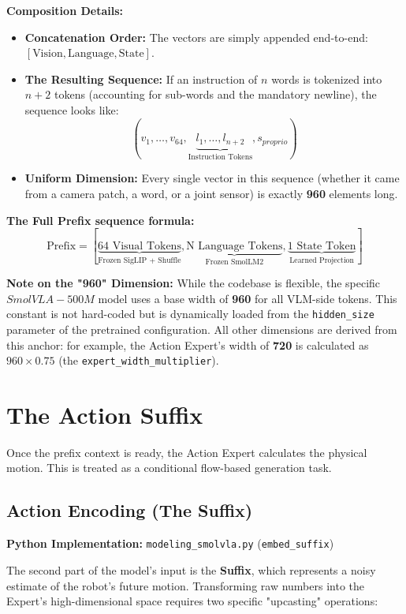 \documentclass[11pt,a4paper]{article}
\begin{document}
\textbf{Composition Details:}
\begin{itemize}
    \item \textbf{Concatenation Order:} The vectors are simply appended end-to-end: $[ \text{Vision} , \text{Language} , \text{State} ]$.
    \item \textbf{The Resulting Sequence:} If an instruction of $n$ words is tokenized into $n+2$ tokens (accounting for sub-words and the mandatory newline), the sequence looks like:
    \[ (v_1, \dots, v_{64}, \underbrace{l_1, \dots, l_{n+2}}_{\text{Instruction Tokens}}, s_{proprio}) \]
    \item \textbf{Uniform Dimension:} Every single vector in this sequence (whether it came from a camera patch, a word, or a joint sensor) is exactly \textbf{960} elements long.
\end{itemize}

\textbf{The Full Prefix sequence formula:}
\[ \text{Prefix} = [ \underbrace{\text{64 Visual Tokens}}_{\text{Frozen SigLIP + Shuffle}} , \underbrace{\text{N Language Tokens}}_{\text{Frozen SmolLM2}} , \underbrace{\text{1 State Token}}_{\text{Learned Projection}} ] \]

\textbf{Note on the "960" Dimension:}
While the codebase is flexible, the specific $SmolVLA-500M$ model uses a base width of \textbf{960} for all VLM-side tokens. This constant is not hard-coded but is dynamically loaded from the \texttt{hidden\_size} parameter of the pretrained configuration. All other dimensions are derived from this anchor: for example, the Action Expert's width of \textbf{720} is calculated as $960 \times 0.75$ (the \texttt{expert\_width\_multiplier}).

\section{The Action Suffix}
Once the prefix context is ready, the Action Expert calculates the physical motion. This is treated as a conditional flow-based generation task.

\subsection{Action Encoding (The Suffix)}
\textbf{Python Implementation:} \texttt{modeling\_smolvla.py} (\texttt{embed\_suffix})

The second part of the model's input is the \textbf{Suffix}, which represents a noisy estimate of the robot's future motion. Transforming raw numbers into the Expert's high-dimensional space requires two specific "upcasting" operations:
\end{document}
